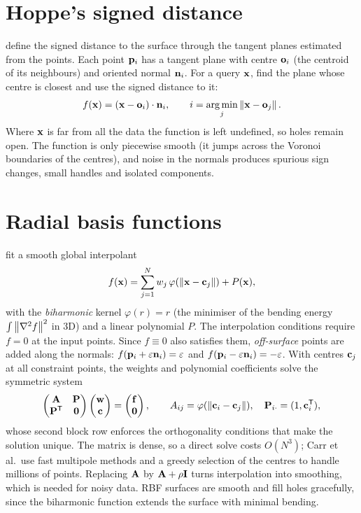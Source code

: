 \section{Hoppe's signed distance}

 define the signed distance to the surface through the tangent planes estimated
from the points. Each point $\mathbf{p}_i$ has a tangent plane with centre $\mathbf{o}_i$ (the centroid of its
neighbours) and oriented normal $\mathbf{n}_i$. For a query $\mathbf{x}$, find the plane whose centre is closest
and use the signed distance to it:
\begin{equation}
f(\mathbf{x})=(\mathbf{x}-\mathbf{o}_i)\cdot\mathbf{n}_i,\qquad i=\operatorname*{arg\,min}_j\left\lVert \mathbf{x}-\mathbf{o}_j\right\rVert.
\end{equation}
Where $\mathbf{x}$ is far from all the data the function is left undefined, so holes remain open. The
function is only piecewise smooth (it jumps across the Voronoi boundaries of the centres), and
noise in the normals produces spurious sign changes, small handles and isolated components.

\section{Radial basis functions}

 fit a smooth global interpolant
\begin{equation}
f(\mathbf{x})=\sum_{j=1}^Nw_j\,\varphi(\left\lVert \mathbf{x}-\mathbf{c}_j\right\rVert)+P(\mathbf{x}),
\end{equation}
with the \emph{biharmonic} kernel $\varphi(r)=r$ (the minimiser of the bending energy
$\int\left\lVert \nabla^2f\right\rVert^2$ in 3D) and a linear polynomial $P$. The interpolation conditions require
$f=0$ at the input points. Since $f\equiv0$ also satisfies them, \emph{off-surface} points are added
along the normals: $f(\mathbf{p}_i+\varepsilon\mathbf{n}_i)=\varepsilon$ and $f(\mathbf{p}_i-\varepsilon\mathbf{n}_i)=-\varepsilon$.
With centres $\mathbf{c}_j$ at all constraint points, the weights and polynomial coefficients solve the
symmetric system
\begin{equation}
\begin{pmatrix}\mathbf{A}&\mathbf{P}\\\mathbf{P}^{\mathsf{T}}&\mathbf{0}\end{pmatrix}\begin{pmatrix}\mathbf{w}\\\mathbf{c}\end{pmatrix}=
\begin{pmatrix}\mathbf{f}\\\mathbf{0}\end{pmatrix},\qquad A_{ij}=\varphi(\left\lVert \mathbf{c}_i-\mathbf{c}_j\right\rVert),\quad
\mathbf{P}_{i\cdot}=(1,\mathbf{c}_i^{\mathsf{T}}),
\end{equation}
whose second block row enforces the orthogonality conditions that make the solution unique. The
matrix is dense, so a direct solve costs $O(N^3)$; Carr et al.\ use fast multipole methods and a
greedy selection of the centres to handle millions of points. Replacing $\mathbf{A}$ by $\mathbf{A}+\rho\mathbf{I}$
turns interpolation into smoothing, which is needed for noisy data. RBF surfaces are smooth and
fill holes gracefully, since the biharmonic function extends the surface with minimal bending.

